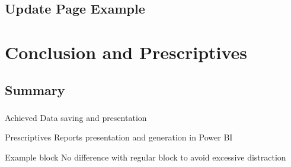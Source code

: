 \subsection{Update Page Example}
\begin{frame}[fragile=singleslide]{\insertsectionhead}
  \framesubtitle{\insertsubsectionhead}
  \begin{figure}[b]
  \end{figure}
\end{frame}

\section{Conclusion and Prescriptives}

\subsection{Summary}
\begin{frame}
  \frametitle{\insertsectionhead}
  \framesubtitle{\insertsubsectionhead}
  \begin{exampleblock}{Achieved}
    Data saving and presentation
  \end{exampleblock}
  \begin{alertblock}{Prescriptives}
    Reports presentation and generation in Power BI
  \end{alertblock}
  \begin{exampleblock}{Example block}
    No difference with regular block to avoid excessive distraction
  \end{exampleblock}
\end{frame}

